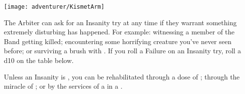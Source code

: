 \begin{center}
\texttt{[image: adventurer/KismetArm]}
\end{center}



\newpage







The Arbiter can ask for an Insanity try at any time if they warrant something extremely disturbing has happened. For example:  witnessing a member of the Band getting killed; encountering some horrifying creature you've never seen before; or surviving a brush with . If you roll a Failure on an Insanity try, roll a d10 on the table below.

Unless an Insanity is , you can be rehabilitated through a dose of ; through the miracle of ; or by the services of a  in a . 


